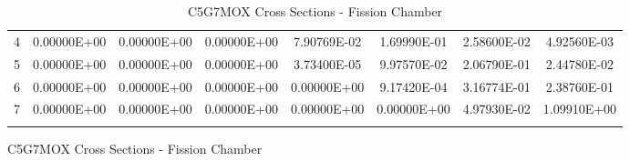 \begin{figure}
\begin{table}[H]
\begin{subtable}[h]{1.0\textwidth}
{\begin{tabular}{*8c}
4 &	0.00000E+00 &	0.00000E+00 &	0.00000E+00 &	7.90769E-02 &	1.69990E-01 &	2.58600E-02 &	4.92560E-03 \\
5 &	0.00000E+00 &	0.00000E+00 &	0.00000E+00 &	3.73400E-05 &	9.97570E-02 &	2.06790E-01 &	2.44780E-02 \\
6 &	0.00000E+00 &	0.00000E+00 &	0.00000E+00 &	0.00000E+00 &	9.17420E-04 &	3.16774E-01 &	2.38760E-01 \\
7 &	0.00000E+00 &	0.00000E+00 &	0.00000E+00 &	0.00000E+00 &	0.00000E+00 &	4.97930E-02 &	1.09910E+00 \\
        \bottomrule
        & & & & & & & 
    \end{tabular}}
  \end{subtable}
  \caption{C5G7MOX Cross Sections - Fission Chamber}
\end{table}
\end{figure}

